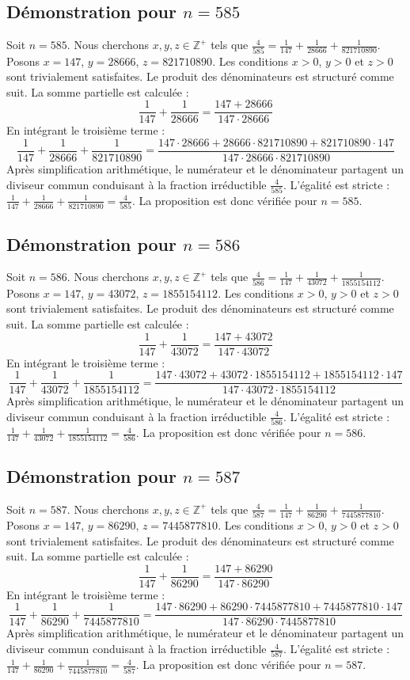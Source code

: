 \documentclass[11pt,a4paper]{article}
\begin{document}
\subsection{Démonstration pour $n = 585$}
Soit $n = 585$. Nous cherchons $x, y, z \in \mathbb{Z}^{+}$ tels que $\frac{4}{585} = \frac{1}{147} + \frac{1}{28666} + \frac{1}{821710890}$.
Posons $x = 147$, $y = 28666$, $z = 821710890$.
Les conditions $x > 0$, $y > 0$ et $z > 0$ sont trivialement satisfaites.
Le produit des dénominateurs est structuré comme suit. La somme partielle est calculée :
$$ \frac{1}{147} + \frac{1}{28666} = \frac{147+28666}{147 \cdot 28666} $$
En intégrant le troisième terme :
$$ \frac{1}{147} + \frac{1}{28666} + \frac{1}{821710890} = \frac{147 \cdot 28666 + 28666 \cdot 821710890 + 821710890 \cdot 147}{147 \cdot 28666 \cdot 821710890} $$
Après simplification arithmétique, le numérateur et le dénominateur partagent un diviseur commun conduisant à la fraction irréductible $\frac{4}{585}$.
L'égalité est stricte : $\frac{1}{147} + \frac{1}{28666} + \frac{1}{821710890} = \frac{4}{585}$.
La proposition est donc vérifiée pour $n = 585$.
\subsection{Démonstration pour $n = 586$}
Soit $n = 586$. Nous cherchons $x, y, z \in \mathbb{Z}^{+}$ tels que $\frac{4}{586} = \frac{1}{147} + \frac{1}{43072} + \frac{1}{1855154112}$.
Posons $x = 147$, $y = 43072$, $z = 1855154112$.
Les conditions $x > 0$, $y > 0$ et $z > 0$ sont trivialement satisfaites.
Le produit des dénominateurs est structuré comme suit. La somme partielle est calculée :
$$ \frac{1}{147} + \frac{1}{43072} = \frac{147+43072}{147 \cdot 43072} $$
En intégrant le troisième terme :
$$ \frac{1}{147} + \frac{1}{43072} + \frac{1}{1855154112} = \frac{147 \cdot 43072 + 43072 \cdot 1855154112 + 1855154112 \cdot 147}{147 \cdot 43072 \cdot 1855154112} $$
Après simplification arithmétique, le numérateur et le dénominateur partagent un diviseur commun conduisant à la fraction irréductible $\frac{4}{586}$.
L'égalité est stricte : $\frac{1}{147} + \frac{1}{43072} + \frac{1}{1855154112} = \frac{4}{586}$.
La proposition est donc vérifiée pour $n = 586$.
\subsection{Démonstration pour $n = 587$}
Soit $n = 587$. Nous cherchons $x, y, z \in \mathbb{Z}^{+}$ tels que $\frac{4}{587} = \frac{1}{147} + \frac{1}{86290} + \frac{1}{7445877810}$.
Posons $x = 147$, $y = 86290$, $z = 7445877810$.
Les conditions $x > 0$, $y > 0$ et $z > 0$ sont trivialement satisfaites.
Le produit des dénominateurs est structuré comme suit. La somme partielle est calculée :
$$ \frac{1}{147} + \frac{1}{86290} = \frac{147+86290}{147 \cdot 86290} $$
En intégrant le troisième terme :
$$ \frac{1}{147} + \frac{1}{86290} + \frac{1}{7445877810} = \frac{147 \cdot 86290 + 86290 \cdot 7445877810 + 7445877810 \cdot 147}{147 \cdot 86290 \cdot 7445877810} $$
Après simplification arithmétique, le numérateur et le dénominateur partagent un diviseur commun conduisant à la fraction irréductible $\frac{4}{587}$.
L'égalité est stricte : $\frac{1}{147} + \frac{1}{86290} + \frac{1}{7445877810} = \frac{4}{587}$.
La proposition est donc vérifiée pour $n = 587$.
\end{document}

